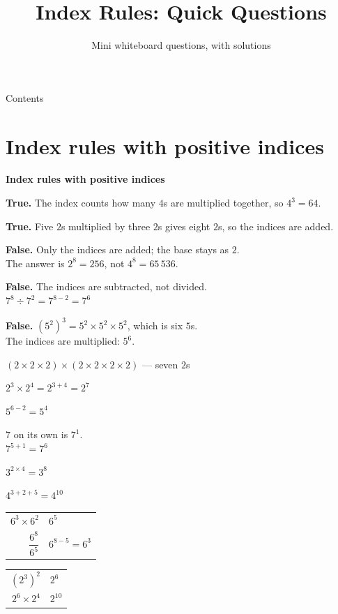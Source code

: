 \documentclass[aspectratio=169]{beamer}
\title{Index Rules: Quick Questions}
\subtitle{Mini whiteboard questions, with solutions}
\author{}
\date{}
\makeatletter
\newcommand{\qtopic}[1]{%
  \section{#1}%
  \begin{frame}
    \vfill
    \begin{center}
      {\usebeamercolor[fg]{structure}\Huge\bfseries #1}
    \end{center}
    \vfill
  \end{frame}%
}
\newcommand{\work}[1]{%
  \begin{tabular}{@{}r@{\;=\;}l@{}}#1\end{tabular}%
}
\makeatother
\begin{document}
\frame{\titlepage}

\begin{frame}[label=contents]{Contents}
  \small
  \tableofcontents
\end{frame}

\qtopic{Index rules with positive indices}

  {\textbf{True.} The index counts how many $4$s are multiplied
   together, so $4^{3}=64$.}

  {\textbf{True.} Five $2$s multiplied by three $2$s gives eight $2$s,
   so the indices are added.}

  {\textbf{False.} Only the indices are added; the base stays as $2$.\\[0.3em]
   The answer is $2^{8}=256$, not $4^{8}=65\,536$.}

  {\textbf{False.} The indices are subtracted, not divided.\\[0.3em]
   $7^{8}\div 7^{2}=7^{8-2}=7^{6}$}

  {\textbf{False.} $\left(5^{2}\right)^{3}=5^{2}\times 5^{2}\times 5^{2}$,
   which is six $5$s.\\[0.3em]
   The indices are multiplied: $5^{6}$.}

  {$(2\times 2\times 2)\times(2\times 2\times 2\times 2)$ --- seven $2$s
   \par\vspace{0.4em}
   $2^{3}\times 2^{4}=2^{3+4}=2^{7}$}

  {$5^{6-2}=5^{4}$}

  {$7$ on its own is $7^{1}$.\\[0.3em]
   $7^{5+1}=7^{6}$}

  {$3^{2\times 4}=3^{8}$}

  {$4^{3+2+5}=4^{10}$}

  {\work{$6^{3}\times 6^{2}$ & $6^{5}$\\[0.3em]
         $\dfrac{6^{8}}{6^{5}}$ & $6^{8-5}=6^{3}$}}

  {\work{$\left(2^{3}\right)^{2}$ & $2^{6}$\\[0.3em]
         $2^{6}\times 2^{4}$ & $2^{10}$}}
\end{document}
